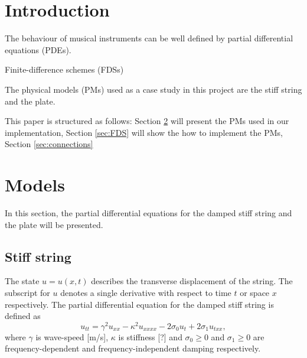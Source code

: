 \documentclass{article}
\title{\papertitle}
\begin{document}
%
\capstartfalse
\maketitle
\capstarttrue
%
\begin{abstract}
Lorum Ipsum
\end{abstract}
%

\section{Introduction}\label{sec:introduction}
The behaviour of musical instruments can be well defined by partial differential equations (PDEs).

Finite-difference schemes (FDSs)


The physical models (PMs) used as a case study in this project are the stiff string and the plate.

This paper is structured as follows: Section \ref{sec:PDE} will present the PMs used in our implementation, Section \ref{sec:FDS} will show the how to implement the PMs, Section \ref{sec:connections}

\section{Models}\label{sec:PDE}
In this section, the partial differential equations for the damped stiff string and the plate will be presented. 


\subsection{Stiff string}\label{subsec:stiffStringPDE}
The state $u = u(x,t)$ describes the transverse displacement of the string. The subscript for $u$ denotes a single derivative with respect to time $t$ or space $x$ respectively. The partial differential equation for the damped stiff string is defined as \cite{Bilbao2009:NumericalSoundSynthesis} 
\begin{equation}\label{eq:stiffString}
    u_{tt} = \gamma^2 u_{xx}-\kappa^2u_{xxxx} - 2\sigma_0u_{t} + 2\sigma_1u_{txx},
\end{equation}
where $\gamma$ is wave-speed [m/s], $\kappa$ is stiffness [?] and $\sigma_0 \geq 0$ and $\sigma_1 \geq 0$ are frequency-dependent and frequency-independent damping respectively.
\end{document}
